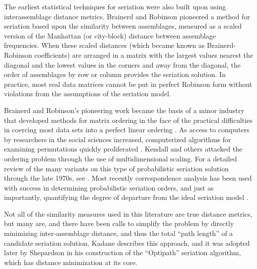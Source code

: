 \documentclass[graybox,natbib]{svmult}
\begin{document}
The earliest statistical techniques for seriation were also built upon
using interassemblage distance metrics. Brainerd and Robinson
\citep{Brainerd1951, Robinson1951} pioneered a method for seriation
based upon the similarity between assemblages, measured as a scaled
version of the Manhattan (or city-block) distance between assemblage
frequencies. When these scaled distances (which became known as
Brainerd-Robinson coefficients) are arranged in a matrix with the
largest values nearest the diagonal and the lowest values in the corners
and away from the diagonal, the order of assemblages by row or column
provides the seriation solution. In practice, most real data matrices
cannot be put in perfect Robinson form without violations from the
assumptions of the seriation model.

Brainerd and Robinson's pioneering work became the basis of a minor
industry that developed methods for matrix ordering in the face of the
practical difficulties in coercing most data sets into a perfect linear
ordering
\citep[e.g.,][]{dempsey1963statistical, Kendall1963, Matthews1963, Bordaz1970aa, Gardin1970, Kendall1970, Kendall1971}.
As access to computers by researchers in the social sciences increased,
computerized algorithms for examining permutations quickly proliferated
\citep{Ascher1963, craytor1968refinements, Kuzara1966}. Kendall
\citeyearpar{Kendall1969} and others attacked the ordering problem
through the use of multidimensional scaling. For a detailed review of
the many variants on this type of probabilistic seriation solution
through the late 1970s, see \citep{Marquardt:1978aa}. Most recently
correspondence analysis has been used with success in determining
probabilistic seriation orders, and just as importantly, quantifying the
degree of departure from the ideal seriation model \citep{Smith2005}.

Not all of the similarity measures used in this literature are true
distance metrics, but many are, and there have been calls to simplify
the problem by directly minimizing inter-assemblage distance, and thus
the total ``path length'' of a candidate seriation solution. Kadane
\citeyearpar{Kadane1971} describes this approach, and it was adopted
later by Shepardson \citeyearpar{shepardson2006} in his construction of
the ``Optipath'' seriation algorithm, which has distance minimization at
its core.
\end{document}
